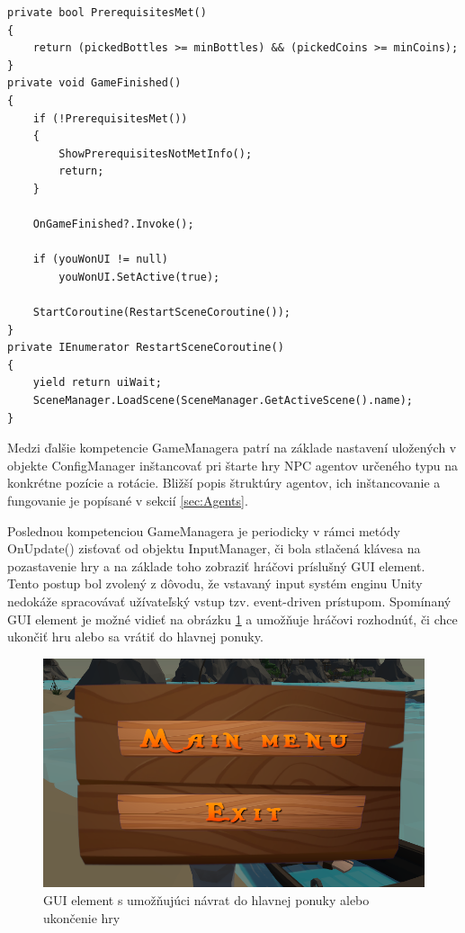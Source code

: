 \documentclass[slovak, master]{diploma}
\begin{document}
\vspace{8pt}
\begin{lstlisting}[label=src:FinishGame,caption={Ukončenie hry v prípade výhry hráča}]
private bool PrerequisitesMet()
{
    return (pickedBottles >= minBottles) && (pickedCoins >= minCoins);
}
private void GameFinished()
{
    if (!PrerequisitesMet())
    {
        ShowPrerequisitesNotMetInfo();
        return;
    }

    OnGameFinished?.Invoke();

    if (youWonUI != null)
        youWonUI.SetActive(true);

    StartCoroutine(RestartSceneCoroutine());
}
private IEnumerator RestartSceneCoroutine()
{
    yield return uiWait;
    SceneManager.LoadScene(SceneManager.GetActiveScene().name);
}
\end{lstlisting}

Medzi ďalšie kompetencie GameManagera patrí na základe nastavení uložených v objekte ConfigManager inštancovať pri štarte hry NPC agentov určeného typu na konkrétne pozície a rotácie. Bližší popis štruktúry agentov, ich inštancovanie a fungovanie je popísané v sekcií \ref{sec:Agents}.

Poslednou kompetenciou GameManagera je periodicky v rámci metódy OnUpdate() zisťovať od objektu InputManager, či bola stlačená klávesa na pozastavenie hry a na základe toho zobraziť hráčovi príslušný GUI element. Tento postup bol zvolený z dôvodu, že vstavaný input systém enginu Unity nedokáže spracovávať užívateľský vstup tzv. event-driven prístupom. Spomínaný GUI element je možné vidieť na obrázku \ref{pic:PauseUI} a umožňuje hráčovi rozhodnúť, či chce ukončiť hru alebo sa vrátiť do hlavnej ponuky. 

\begin{figure}[!htbp]
    \centering
    \includegraphics[width=.65\textwidth]{Figures/pauseUI.png}
    \caption{GUI element s umožňujúci návrat do hlavnej ponuky alebo ukončenie hry}
    \label{pic:PauseUI}
\end{figure}
\end{document}
